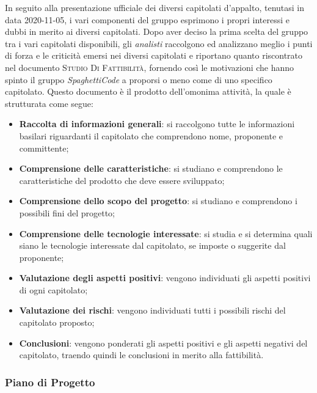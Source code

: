 In seguito alla presentazione ufficiale dei diversi capitolati d'appalto, tenutasi in data 2020-11-05, i vari componenti 
del gruppo esprimono i propri interessi e dubbi in merito ai diversi capitolati.
Dopo aver deciso la prima scelta del gruppo tra i vari capitolati disponibili, gli \emph{analisti} 
raccolgono ed analizzano meglio i punti di forza e le criticità emersi nei diversi capitolati e riportano quanto 
riscontrato nel documento \textsc{Studio Di Fattibilità}, fornendo così le motivazioni che hanno spinto il gruppo 
\emph{SpaghettiCode} a proporsi o meno come  di uno specifico capitolato. Questo documento è il 
prodotto dell'omonima attività, la quale è strutturata come segue: 
\begin{itemize}
    \item \textbf{Raccolta di informazioni generali}: si raccolgono tutte le informazioni basilari riguardanti il 
    capitolato che comprendono nome, proponente e committente;
    \item \textbf{Comprensione delle caratteristiche}: si studiano e comprendono le caratteristiche del prodotto che 
    deve essere sviluppato;
    \item \textbf{Comprensione dello scopo del progetto}: si studiano e comprendono i possibili fini del progetto;
    \item \textbf{Comprensione delle tecnologie interessate}: si studia e si determina quali siano le tecnologie 
    interessate dal capitolato, se imposte o suggerite dal proponente;
    \item \textbf{Valutazione degli aspetti positivi}: vengono individuati gli aspetti positivi di ogni capitolato;
    \item \textbf{Valutazione dei rischi}: vengono individuati tutti i possibili rischi del capitolato proposto;  
    \item \textbf{Conclusioni}: vengono ponderati gli aspetti positivi e gli aspetti negativi del capitolato, traendo 
    quindi le conclusioni in merito alla fattibilità.
\end{itemize}

\subsubsection{Piano di Progetto}
\label{par:pdp}


